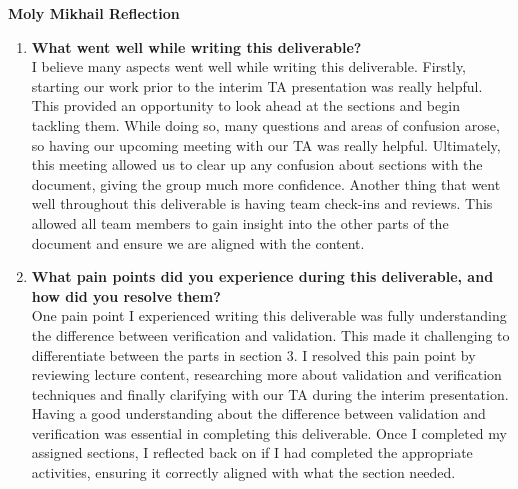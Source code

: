 \documentclass[12pt, titlepage]{article}
\begin{document}
\textbf{Moly Mikhail Reflection}
\begin{enumerate}
  \item \textbf{What went well while writing this deliverable?}\\
    I believe many aspects went well while writing this deliverable.
    Firstly, starting our work prior to the interim TA presentation
    was really helpful.
    This provided an opportunity to look ahead at the sections and
    begin tackling them. While doing so, many questions and areas of
    confusion arose, so having our upcoming meeting with our TA was
    really helpful.
    Ultimately, this meeting allowed us to clear up any confusion
    about sections with the document, giving the group much more
    confidence. Another thing that went well throughout this
    deliverable is having team check-ins and reviews.
    This allowed all team members to gain insight into the other
    parts of the document and ensure we are aligned with the content.
  \item \textbf{What pain points did you experience during this
      deliverable, and how
    did you resolve them?}\\
    One pain point I experienced writing this deliverable was fully
    understanding the difference between verification and validation.
    This made it challenging to differentiate between the parts in section 3.
    I resolved this pain point by reviewing lecture content,
    researching more about validation and verification techniques and
    finally clarifying with our TA during the interim presentation.
    Having a good understanding about the difference between
    validation and verification was essential in completing this
    deliverable. Once I completed
    my assigned sections, I reflected back on if I had completed the
    appropriate activities, ensuring it correctly aligned with what
    the section needed.
\end{enumerate}
\end{document}
